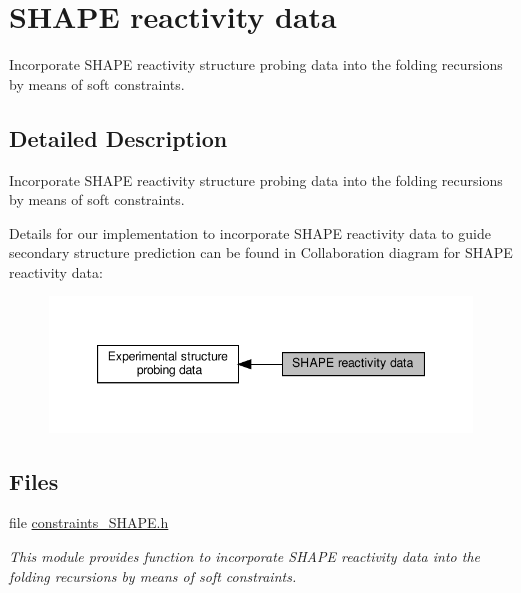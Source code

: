 \hypertarget{group__SHAPE__reactivities}{}\section{S\+H\+A\+PE reactivity data}
\label{group__SHAPE__reactivities}


Incorporate S\+H\+A\+PE reactivity structure probing data into the folding recursions by means of soft constraints.  




\subsection{Detailed Description}
Incorporate S\+H\+A\+PE reactivity structure probing data into the folding recursions by means of soft constraints. 

Details for our implementation to incorporate S\+H\+A\+PE reactivity data to guide secondary structure prediction can be found in \cite{lorenz:2016a} Collaboration diagram for S\+H\+A\+PE reactivity data\+:
\nopagebreak
\begin{figure}[H]
\begin{center}
\leavevmode
\includegraphics[width=347pt]{group__SHAPE__reactivities}
\end{center}
\end{figure}
\subsection*{Files}
\begin{DoxyCompactItemize}
\item 
file \hyperlink{constraints__SHAPE_8h}{constraints\+\_\+\+S\+H\+A\+P\+E.\+h}
\begin{DoxyCompactList}\small\item\em This module provides function to incorporate S\+H\+A\+PE reactivity data into the folding recursions by means of soft constraints. \end{DoxyCompactList}\end{DoxyCompactItemize}
